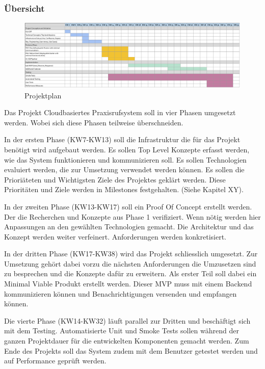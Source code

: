 \subsubsection*{Übersicht}
\begin{figure}[h]
    \label{fig:projectPlan}
    \includegraphics[width=\linewidth]{graphics/Projectplanning}\caption[Projektplan]{Projektplan}
\end{figure}

Das Projekt Cloudbasiertes Praxisrufsystem soll in vier Phasen umgesetzt werden.
Wobei sich diese Phasen teilweise überschneiden.

In der ersten Phase (KW7-KW13) soll die Infrastruktur die für das Projekt benötigt wird aufgebaut werden.
Es sollen Top Level Konzepte erfasst werden, wie das System funktionieren und kommunizieren soll.
Es sollen Technologien evaluiert werden, die zur Umsetzung verwendet werden können.
Es sollen die Prioriäteten und Wichtigsten Ziele des Projektes geklärt werden.
Diese Prioritäten und Ziele werden in Milestones festgehalten. (Siehe Kapitel XY).

In der zweiten Phase (KW13-KW17) soll ein Proof Of Concept erstellt werden.
Der die Recherchen und Konzepte aus Phase 1 verifiziert.
Wenn nötig werden hier Anpassungen an den gewählten Technologien gemacht.
Die Architektur und das Konzept werden weiter verfeinert.
Anforderungen werden konkretisiert.

In der dritten Phase (KW17-KW38) wird das Projekt schliesslich umgesetzt.
Zur Umsetzung gehört dabei vorzu die nächsten Anforderungen die Umzusetzen sind zu besprechen und die Konzepte dafür zu erweitern.
Als erster Teil soll dabei ein Minimal Viable Produkt erstellt werden.
Dieser MVP muss mit einem Backend kommunizieren können und Benachrichtigungen versenden und empfangen können.

Die vierte Phase (KW14-KW32) läuft parallel zur Dritten und beschäftigt sich mit dem Testing.
Automatisierte Unit und Smoke Tests sollen während der ganzen Projektdauer für die entwickelten Komponenten gemacht werden.
Zum Ende des Projekts soll das System zudem mit dem Benutzer getestet werden und auf Performance geprüft werden.

